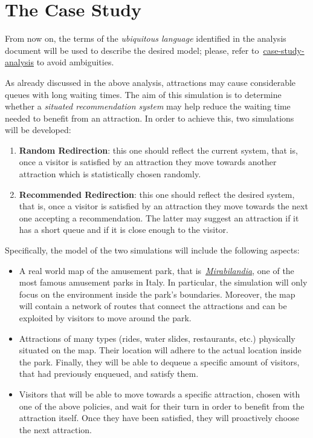 \section{The Case Study}\label{sec:the-case-study}

From now on, the terms of the \textit{ubiquitous language} identified in the analysis document will be used to describe the desired model;
please, refer to~\href{https://github.com/ICPS-MicroCity/case-study-analysis/releases/tag/v0.2.1}{case-study-analysis} to avoid ambiguities.

As already discussed in the above analysis, attractions may cause considerable queues with long waiting times.
The aim of this simulation is to determine whether a \textit{situated recommendation system} may help reduce the waiting time needed to benefit from an attraction.
In order to achieve this, two simulations will be developed:
\begin{enumerate}
    \item \textbf{Random Redirection}: this one should reflect the current system, that is, once a visitor is satisfied by an attraction they move towards another attraction which is statistically chosen randomly.
    \item \textbf{Recommended Redirection}: this one should reflect the desired system, that is, once a visitor is satisfied by an attraction they move towards the next one accepting a recommendation.
    The latter may suggest an attraction if it has a short queue and if it is close enough to the visitor.
\end{enumerate}
%
Specifically, the model of the two simulations will include the following aspects:
\begin{itemize}
    \item A real world map of the amusement park, that is~\href{https://www.mirabilandia.it/}{\textit{Mirabilandia}}, one of the most famous amusement parks in Italy.
    In particular, the simulation will only focus on the environment inside the park's boundaries.
    Moreover, the map will contain a network of routes that connect the attractions and can be exploited by visitors to move around the park.
    \item Attractions of many types (rides, water slides, restaurants, etc.) physically situated on the map.
    Their location will adhere to the actual location inside the park.
    Finally, they will be able to dequeue a specific amount of visitors, that had previously enqueued, and satisfy them.
    \item Visitors that will be able to move towards a specific attraction, chosen with one of the above policies, and wait for their turn in order to benefit from the attraction itself.
    Once they have been satisfied, they will proactively choose the next attraction.
\end{itemize}
